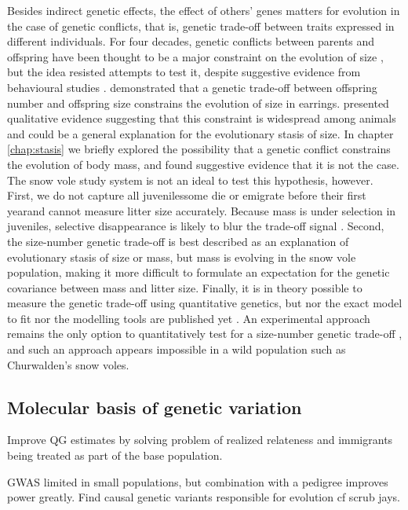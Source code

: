 Besides indirect genetic effects, the effect of others' genes matters for evolution in the case of genetic conflicts, that is, genetic trade-off between traits expressed in different individuals.
For four decades, genetic conflicts between parents and offspring have been thought to be a major constraint on the evolution of size \parencite[since][]{Trivers1974}, but the idea resisted attempts to test it, despite suggestive evidence from behavioural studies \parencite{Kolliker2015}. \cite{Kolliker2015} demonstrated that a genetic trade-off between offspring number and offspring size constrains the evolution of size in earrings. \cite{Rollinson2015b} presented qualitative evidence suggesting that this constraint is widespread among animals and could be a general explanation for the evolutionary stasis of size. 
In chapter \ref{chap:stasis} we briefly explored the possibility that a genetic conflict constrains the evolution of body mass, and found suggestive evidence that it is not the case. The snow vole study system is not an ideal to test this hypothesis, however. First, we do not capture all juveniles\textemdash some die or emigrate before their first year\textemdash and cannot measure litter size accurately. Because mass is under selection in juveniles,  selective disappearance is likely to blur the trade-off signal \parencite{Hadfield2011}. Second, the size-number genetic trade-off is best described as an explanation of evolutionary stasis of size or mass, but mass is evolving in the snow vole population, making it more difficult to formulate an expectation for the genetic covariance between mass and litter size. 
Finally, it is in theory possible to measure the genetic trade-off using quantitative genetics, but nor the exact model to fit nor the modelling tools are published yet \parencite{Hadfield2012, Rollinson2015b}. An experimental approach remains the only option to quantitatively test for a size-number genetic trade-off \parencite{Kolliker2015}, and such an approach appears impossible in a wild population such as Churwalden's snow voles. 

\subsection{Molecular basis of genetic variation}

Improve QG estimates by solving problem of realized relateness and immigrants being treated as part of the base population. 

GWAS limited in small populations, but combination with a pedigree improves power greatly. 
Find causal genetic variants responsible for evolution cf scrub jays. 

